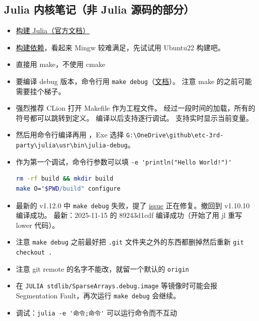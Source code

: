 \subsection{Julia 内核笔记（非 Julia 源码的部分）}
\begin{itemize}
\item \href{https://docs.julialang.org/en/v1/devdocs/build/build/}{构建 Julia（官方文档）}
\item \href{https://docs.julialang.org/en/v1/devdocs/build/build/#Required-Build-Tools-and-External-Libraries}{构建依赖}，看起来 Mingw 较难满足，先试试用 Ubuntu22 构建吧。
\item 直接用 make，不使用 cmake
\item 要编译 debug 版本，命令行用 \verb`make debug`（\href{https://docs.julialang.org/en/v1/devdocs/backtraces/}{文档}）。 注意 make 的之前可能需要挂个梯子。
\item 强烈推荐 CLion 打开 Makefile 作为工程文件。 经过一段时间的加载，所有的符号都可以跳转到定义。 编译以后支持逐行调试。 支持实时显示当前变量。
\item 然后用命令行编译再用 ，Exe 选择 \verb`G:\OneDrive\github\etc-3rd-party\julia\usr\bin\julia-debug`。
\item 作为第一个调试，命令行参数可以填 \verb`-e 'println("Hello World!")'`
\begin{lstlisting}[language=bash]
rm -rf build && mkdir build
make O="$PWD/build" configure
\end{lstlisting}
\item 最新的 v1.12.0 中 \verb`make debug` 失败，提了 \href{https://github.com/JuliaLang/julia/issues/57675}{issue} 正在修复。撤回到 v1.10.10 编译成功。 最新：2025-11-15 的 89243d1cdf 编译成功（开始了用 jl 重写 lower 代码）。
\item 注意 \verb`make debug` 之前最好把 \verb`.git` 文件夹之外的东西都删掉然后重新 \verb`git checkout .`
\item 注意 git remote 的名字不能改，就留一个默认的 \verb`origin`
\item 在 \verb`JULIA stdlib/SparseArrays.debug.image` 等镜像时可能会报 Segmentation Fault，再次运行 \verb`make debug` 会继续。

\item 调试：\verb`julia -e '命令;命令'` 可以运行命令而不互动
\end{itemize}

